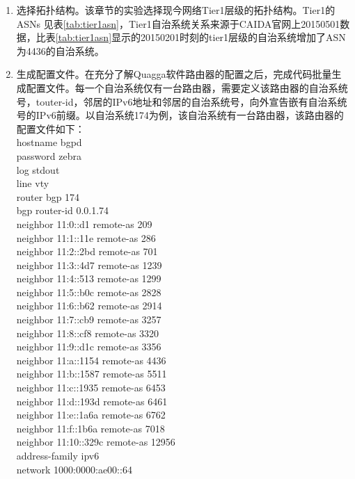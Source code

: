 \begin{enumerate}
\item 选择拓扑结构。该章节的实验选择现今网络Tier1层级\cite{tier1}的拓扑结构。Tier1的ASNs 见表\ref{tab:tier1asn}，Tier1自治系统关系来源于CAIDA官网上20150501数据，比表\ref{tab:tier1asn}显示的20150201时刻的tier1层级的自治系统增加了ASN为4436的自治系统。
\item 生成配置文件。在充分了解Quagga软件路由器的配置之后，完成代码批量生成配置文件。每一个自治系统仅有一台路由器，需要定义该路由器的自治系统号，touter-id，邻居的IPv6地址和邻居的自治系统号，向外宣告嵌有自治系统号的IPv6前缀。以自治系统174为例，该自治系统有一台路由器，该路由器的配置文件如下：\\
    hostname bgpd\\
    password zebra\\
    log stdout\\
    line vty\\
    router bgp 174\\
     bgp router-id 0.0.1.74\\
     neighbor 11:0::d1 remote-as 209\\
     neighbor 11:1::11e remote-as 286\\
     neighbor 11:2::2bd remote-as 701\\
     neighbor 11:3::4d7 remote-as 1239\\
     neighbor 11:4::513 remote-as 1299\\
     neighbor 11:5::b0c remote-as 2828\\
     neighbor 11:6::b62 remote-as 2914\\
     neighbor 11:7::cb9 remote-as 3257\\
     neighbor 11:8::cf8 remote-as 3320\\
     neighbor 11:9::d1c remote-as 3356\\
     neighbor 11:a::1154 remote-as 4436\\
     neighbor 11:b::1587 remote-as 5511\\
     neighbor 11:c::1935 remote-as 6453\\
     neighbor 11:d::193d remote-as 6461\\
     neighbor 11:e::1a6a remote-as 6762\\
     neighbor 11:f::1b6a remote-as 7018\\
     neighbor 11:10::329c remote-as 12956\\
     address-family ipv6\\
     network 1000:0000:ae00::\/64\\

\end{enumerate}

